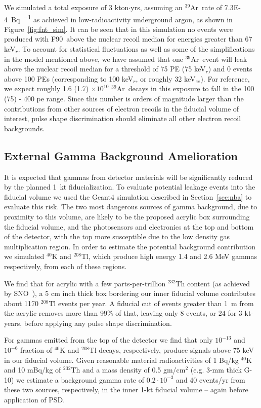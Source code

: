 \documentclass[a4paper,11pt]{article}
\newcommand{\artn}{$^{39}$Ar}
\newcommand{\fnt}{F90}
\begin{document}
We simulated a total exposure of 3 kton$\cdot$yrs, assuming an \artn~rate of \SI{7.3E-4}{\becquerel\per\kgar} as achieved in low-radioactivity underground argon, as shown in Figure~\ref{fig:fnt_sim}. It can be seen that in this simulation no events were produced with \fnt~above the nuclear recoil median for energies greater than 67 keV$_r$. To account for statistical fluctuations as well as some of the simplifications in the model mentioned above, we have assumed that one \artn~event will leak above the nuclear recoil median for a threshold of 75 PE (75 keV$_r$) and 0 events above 100 PEs (corresponding to 100 keV$_r$, or roughly 32 keV$_{ee}$). For reference, we expect roughly 1.6 (1.7) $\times10^{10}$ \artn~decays in this exposure to fall in the 100 (75) - 400 pe range. Since this number is orders of magnitude larger than the contributions from other sources of electron recoils in the fiducial volume of interest, pulse shape discrimination should eliminate all other electron recoil backgrounds.

\subsection{External Gamma Background Amelioration}
\label{sec:gamma_bkgd_calc}
It is expected that gammas from detector materials will be significantly reduced by the planned 1~kt fiducialization. To evaluate potential leakage events into the fiducial volume we used the Geant4 simulation described in Section~\ref{sec:nba} to evaluate this risk. The two most dangerous sources of gamma background, due to proximity to this volume, are likely to be the proposed acrylic box surrounding the fiducial volume, and the photosensors and electronics at the top and bottom of the detector, with the top more susceptible due to the low density gas multiplication region. In order to estimate the potential background contribution we simulated $^{40}$K and $^{208}$Tl, which produce high energy 1.4 and 2.6 MeV gammas respectively, from each of these regions.

We find that for acrylic with a few parts-per-trillion $^{232}$Th content (as achieved by SNO~\cite{acrylic}), a 5 cm inch thick box bordering our inner fiducial volume contributes about 1170 $^{208}$Tl events per year. A fiducial cut of events greater than 1~m from the acrylic removes more than 99\% of that, leaving only 8 events, or 24 for 3 kt-years, before applying any pulse shape discrimination.

For gammas emitted from the top of the detector we find that only $10^{-13}$ and $10^{-6}$ fraction of $^{40}$K and $^{208}$Tl decays, respectively, produce signals above 75 keV in our fiducial volume. Given reasonable material radioactivities of 1 Bq/kg $^{40}$K and 10 mBq/kg of $^{232}$Th and a mass density of 0.5 gm/cm$^2$ (e.g. 3-mm thick G-10) we estimate a background gamma rate of $0.2 \cdot 10^{-3}$ and 40 events/yr from these two sources, respectively, in the inner 1-kt fiducial volume -- again before application of PSD. 
\end{document}
